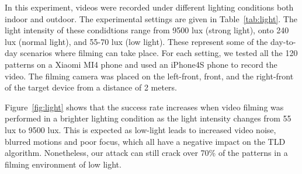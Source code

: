     In this experiment, videos were recorded under different lighting conditions both indoor and outdoor.
    The experimental settings are given in  Table~\ref{tab:light}.
    The light intensity of these condidtions range from 9500
    lux (strong light), onto 240 lux (normal light), and 55-70 lux (low light).
    These represent some of the day-to-day scenarios where filming can
    take place. For each setting, we tested all the 120 patterns on a Xiaomi MI4 phone and used
    an iPhone4S phone to record the video. The filming camera was placed on the
    left-front, front, and the right-front of the target device from a distance
    of 2 meters.


    Figure~\ref{fig:light} shows that the success rate increases when video filming was performed in a brighter lighting condition as the light intensity
    changes from 55 lux to 9500 lux. This is expected as low-light leads to
    increased video noise, blurred motions and poor focus, which all have a
    negative impact on the TLD algorithm. Nonetheless, our attack
    can still crack over 70\% of the patterns in a filming
    environment of low light.

%
%
%

